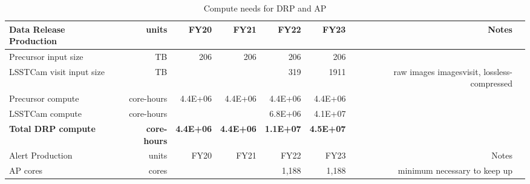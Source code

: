 \tiny \begin{longtable} { |p{}  |r  |r  |r  |r  |r  |r  |r |} 
\caption{Compute needs for DRP and AP \label{tab:drpAndAlertSizing}}\\ 
\hline 
\textbf{Data Release Production}&\textbf{units}&\textbf{FY20}&\textbf{FY21}&\textbf{FY22}&\textbf{FY23}&\textbf{Notes} \\ \hline
{Precursor input size}&{TB}&{206}&{206}&{206}&{206}& \\ \hline
{LSSTCam visit input size}&{TB}&{}&{}&{319}&{1911}&{raw images \/ images\/visit, lossless-compressed} \\ \hline
{Precursor compute}&{core-hours}&{4.4E+06}&{4.4E+06}&{4.4E+06}&{4.4E+06}& \\ \hline
{LSSTCam compute}&{core-hours}&{}&{}&{6.8E+06}&{4.1E+07}& \\ \hline
\textbf{Total DRP compute}&\textbf{core-hours}&\textbf{4.4E+06}&\textbf{4.4E+06}&\textbf{1.1E+07}&\textbf{4.5E+07}& \\ \hline
{Alert Production}&{units}&{FY20}&{FY21}&{FY22}&{FY23}&{Notes} \\ \hline
{AP cores}&{cores}&{}&{}&{1,188}&{1,188}&{minimum necessary to keep up} \\ \hline
\end{longtable} \normalsize
